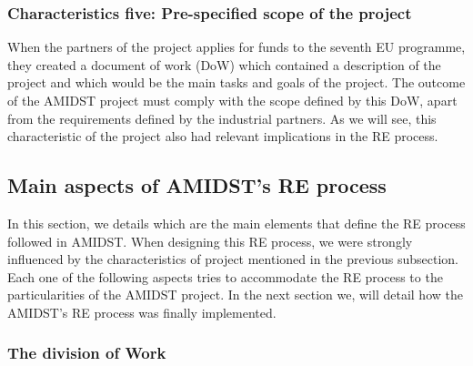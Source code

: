 \documentclass[11pt, oneside]{article}   	%
\begin{document}



\subsubsection*{Characteristics five:  Pre-specified scope of the project}
\label{sec:characteristic5}

When the partners of the project applies for funds to the seventh EU programme,  they created a document of work (DoW) which contained a description of the project and which would be the main tasks and goals of the project. The outcome of the AMIDST project must comply with the scope defined by this DoW, apart from the requirements defined by the industrial partners. As we will see, this characteristic of the project also had relevant implications  in the RE process.

\subsection{Main aspects of  AMIDST's RE process}
\label{sec:reprocess}

In this section, we details which are the main elements that define the RE process followed in AMIDST. When designing this RE process, we were strongly influenced by the characteristics of project mentioned in the previous subsection. Each one of the following aspects tries to accommodate the RE process to the particularities of the AMIDST project. In the next section we, will detail how the AMIDST's RE process was finally implemented. 

\subsubsection*{The division of Work}
\end{document}
